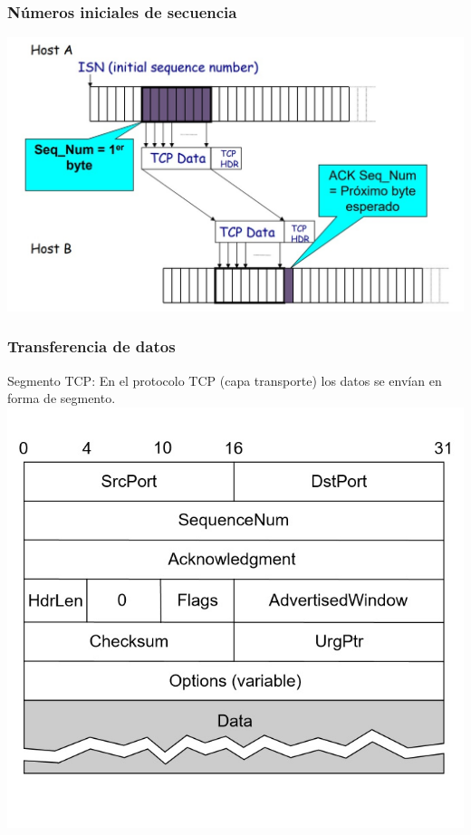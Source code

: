 \documentclass{beamer}
\begin{document}
\begin{frame}
\frametitle{Números iniciales de secuencia}
\includegraphics[scale=0.5]{sqn}\\
\end{frame}

\begin{frame}
\frametitle{Transferencia de datos}
Segmento TCP: En el protocolo TCP (capa transporte) los datos se envían en forma de segmento.\\
\includegraphics[scale=0.5]{segmento}\\
\end{frame}
\end{document}
